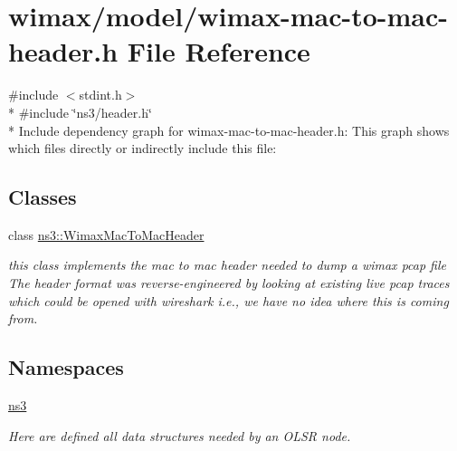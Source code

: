 \hypertarget{wimax-mac-to-mac-header_8h}{}\section{wimax/model/wimax-\/mac-\/to-\/mac-\/header.h File Reference}
\label{wimax-mac-to-mac-header_8h}
{\ttfamily \#include $<$stdint.\+h$>$}\\*
{\ttfamily \#include \char`\"{}ns3/header.\+h\char`\"{}}\\*
Include dependency graph for wimax-\/mac-\/to-\/mac-\/header.h\+:
This graph shows which files directly or indirectly include this file\+:
\subsection*{Classes}
\begin{DoxyCompactItemize}
\item 
class \hyperlink{classns3_1_1WimaxMacToMacHeader}{ns3\+::\+Wimax\+Mac\+To\+Mac\+Header}
\begin{DoxyCompactList}\small\item\em this class implements the mac to mac header needed to dump a wimax pcap file The header format was reverse-\/engineered by looking at existing live pcap traces which could be opened with wireshark i.\+e., we have no idea where this is coming from. \end{DoxyCompactList}\end{DoxyCompactItemize}
\subsection*{Namespaces}
\begin{DoxyCompactItemize}
\item 
 \hyperlink{namespacens3}{ns3}
\begin{DoxyCompactList}\small\item\em Here are defined all data structures needed by an O\+L\+SR node. \end{DoxyCompactList}\end{DoxyCompactItemize}
